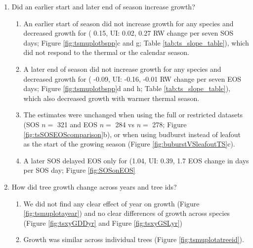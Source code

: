 \documentclass{article}\usepackage[]{graphicx}\usepackage[]{xcolor}
\begin{document}
\begin{enumerate}
\begin{enumerate}
  \item Interestingly, {\Bnig} did not solely respond to current year's conditions (Figure \ref{fig:tsmuplotbspp}a and e; Table \ref{tab:ts_slope_table}), but grew more with warmer thermal season when the previous conditions were considered (
  0.12, UI:
  0.03,
  0.21 RW change per scaled GDD; Figure \ref{fig:tsPrvsYr}a).
  
  \end{enumerate}
  
\item Did an earlier start and later end of season increase growth? 

  \begin{enumerate}
  \item An earlier start of season did not increase growth for any species and decreased growth for {\Tame} (
  0.15, UI:
  0.02,
  0.27 RW change per seven SOS days; Figure \ref{fig:tsmuplotbspp}c and g; Table \ref{tab:ts_slope_table}), which did not respond to the thermal or the calendar season.

\item A later end of season did not increase growth for any species and decreased growth for {\Ball} (
-0.09, UI:
-0.16,
-0.01 RW change per seven EOS days; Figure \ref{fig:tsmuplotbspp}d and h; Table \ref{tab:ts_slope_table}), which also decreased growth with warmer thermal season.

\item The estimates were unchanged when using the full or restricted datasets (SOS $n =$
321 and EOS $n =$
284 vs $n=$
278; Figure \ref{fig:tsSOSEOScomparison}b), or when using budburst instead of leafout as the start of the growing season (Figure \ref{fig:buburstVSleafoutTS}c).


\item A later SOS delayed EOS only for {\Pdel} 
(1.04, UI:
0.39,
1.7 EOS change in days per SOS day; Figure \ref{fig:SOSonEOS}
\end{enumerate}

\item How did tree growth change across years and tree ids?
  \begin{enumerate}
  
  \item We did not find any clear effect of year on growth (Figure \ref{fig:tsmuplotayear}) and no clear differences of growth across species (Figure \ref{fig:tsxyGDDyr} and Figure \ref{fig:tsxyGSLyr})
  
  \item Growth was similar across individual trees (Figure \ref{fig:tsmuplotatreeid}).

  \end{enumerate}
\end{enumerate}
\end{document}
